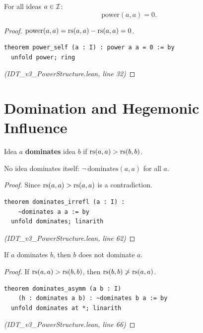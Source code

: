 \begin{theorem}
\label{thm:power-self}
For all ideas $a \in \mathcal{I}$:
\[
  \mathrm{power}(a, a) = 0.
\]
\end{theorem}

\begin{proof}
$\mathrm{power}(a,a) = \mathrm{rs}(a,a) - \mathrm{rs}(a,a) = 0$.
\begin{lstlisting}
theorem power_self (a : I) : power a a = 0 := by
  unfold power; ring
\end{lstlisting}
\textit{(IDT\_v3\_PowerStructure.lean, line 32)}
\end{proof}

\section{Domination and Hegemonic Influence}

\begin{definition}[Domination]
\label{def:domination}
Idea $a$ \textbf{dominates} idea $b$ if $\mathrm{rs}(a,a) > \mathrm{rs}(b,b)$.
\end{definition}

\begin{theorem}
\label{thm:dominates-irrefl}
No idea dominates itself: $\neg\,\mathrm{dominates}(a, a)$ for all $a$.
\end{theorem}

\begin{proof}
Since $\mathrm{rs}(a,a) > \mathrm{rs}(a,a)$ is a contradiction.
\begin{lstlisting}
theorem dominates_irrefl (a : I) :
    ~dominates a a := by
  unfold dominates; linarith
\end{lstlisting}
\textit{(IDT\_v3\_PowerStructure.lean, line 62)}
\end{proof}

\begin{theorem}
\label{thm:dominates-asymm}
If $a$ dominates $b$, then $b$ does not dominate $a$.
\end{theorem}

\begin{proof}
If $\mathrm{rs}(a,a) > \mathrm{rs}(b,b)$, then $\mathrm{rs}(b,b) \not> \mathrm{rs}(a,a)$.
\begin{lstlisting}
theorem dominates_asymm (a b : I)
    (h : dominates a b) : ~dominates b a := by
  unfold dominates at *; linarith
\end{lstlisting}
\textit{(IDT\_v3\_PowerStructure.lean, line 66)}
\end{proof}

